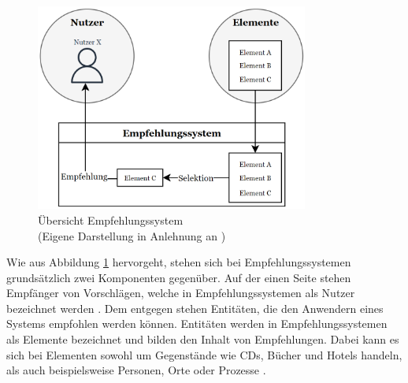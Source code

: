\begin{figure}[H]
    \centering
	\includegraphics[width=0.8\textwidth]{gfx/komponenten-empfehlungssystem.png}
	\caption[Übersicht Empfehlungssystem]{Übersicht Empfehlungssystem\\
	(Eigene Darstellung in Anlehnung an \cite[S. 2]{klahold:book})}
	\label{fig:empfehlungssysteme:einführung:abb1}
\end{figure}

Wie aus Abbildung \ref{fig:empfehlungssysteme:einführung:abb1} hervorgeht, stehen sich bei Empfehlungssystemen grundsätzlich zwei Komponenten gegenüber.
Auf der einen Seite stehen Empfänger von Vorschlägen, welche in Empfehlungssystemen als Nutzer bezeichnet werden \cite[S. 8]{ricci:inbook}.
Dem entgegen stehen Entitäten, die den Anwendern eines Systems empfohlen werden können.
Entitäten werden in Empfehlungssystemen als Elemente bezeichnet und bilden den Inhalt von Empfehlungen.
Dabei kann es sich bei Elementen sowohl um Gegenstände wie CDs, Bücher und Hotels handeln, als auch beispielsweise Personen, Orte oder Prozesse \cite[S. 4]{klahold:book}.

